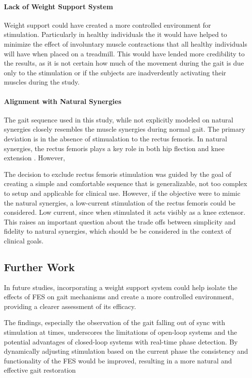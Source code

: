 \paragraph*{Lack of Weight Support System}
Weight support could have created a more controlled environment for stimulation. Particularly in healthy individuals the it would have helped to minimize the effect of involuntary muscle contractions that all healthy individuals will have when placed on a treadmill. This would have lended more credibility to the results, as it is not certain how much of the movement during the gait is due only to the stimulation or if the subjects are inadverdently activating their muscles during the study.
\newline 

\paragraph*{Alignment with Natural Synergies}

The gait sequence used in this study, while not explicitly modeled on natural synergies closely resembles the muscle synergies during normal gait. The primary deviation is in the absence of stimualation to the rectus femoris. In natural synergies, the rectus femoris plays a key role in both hip flection and knee extension . However, 

The decision to exclude rectus femoris stimulation was guided by the goal of creating a simple and comfortable sequence that is generalizable, not too complex to setup and applicable for clinical use. However, if the objective were to mimic the natural synergies, a low-current stimulation of the rectus femoris could be considered. Low current, since when stimulated it acts visibly as a knee extensor. This raises an important question about the trade offs between simplicity and fidelity to natural synergies, which should be be considered in the context of clinical goals.


\subsection{Further Work}
In future studies, incorporating a weight support system could help isolate the effects of FES on gait mechanisms and create a more controlled environment, providing a clearer assessment of its efficacy.

The findings, especially the observation of the gait falling out of sync with stimulation at times, underscores the limitations of open-loop systems and the potential advantages of closed-loop systems with real-time phase detection. By dynamically adjusting stimulation based on the current phase the consistency and functionality of the FES would be improved, resulting in a more natural and effective gait restoration



